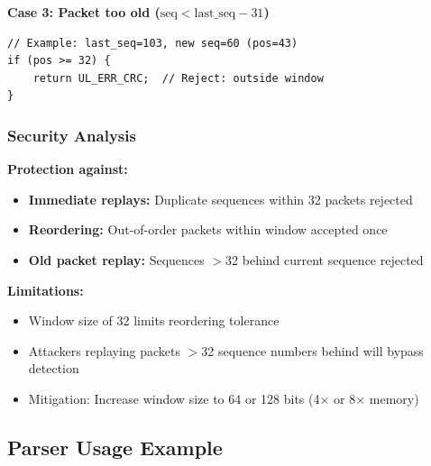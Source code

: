 \documentclass[11pt,a4paper]{article}
\begin{document}
\textbf{Case 3: Packet too old ($\text{seq} < \text{last\_seq} - 31$)}
\begin{lstlisting}
// Example: last_seq=103, new seq=60 (pos=43)
if (pos >= 32) {
    return UL_ERR_CRC;  // Reject: outside window
}
\end{lstlisting}

\subsubsection{Security Analysis}

\textbf{Protection against:}
\begin{itemize}[noitemsep]
    \item \textbf{Immediate replays:} Duplicate sequences within 32 packets rejected
    \item \textbf{Reordering:} Out-of-order packets within window accepted once
    \item \textbf{Old packet replay:} Sequences $>$32 behind current sequence rejected
\end{itemize}

\textbf{Limitations:}
\begin{itemize}[noitemsep]
    \item Window size of 32 limits reordering tolerance
    \item Attackers replaying packets $>$32 sequence numbers behind will bypass detection
    \item Mitigation: Increase window size to 64 or 128 bits (4$\times$ or 8$\times$ memory)
\end{itemize}

\subsection{Parser Usage Example}
\end{document}
